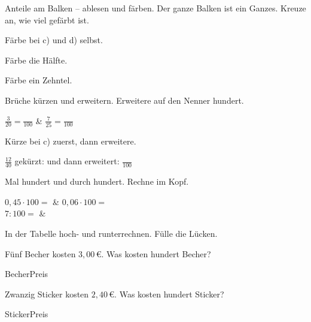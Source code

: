 \documentclass[11pt]{article}
\begin{document}
\weit


\begin{aufgabe}{Anteile am Balken -- ablesen und färben. Der ganze Balken ist ein Ganzes. Kreuze an, wie viel gefärbt ist.}
\begin{teile}
\teil
{}

  
\teil
{}

  
\end{teile}
Färbe bei c) und d) selbst.
\begin{teile}
\teil Färbe die Hälfte.

\teil Färbe ein Zehntel.

\end{teile}
\end{aufgabe}

\begin{aufgabe}{Brüche kürzen und erweitern. Erweitere auf den Nenner hundert.}
\begin{teilezwei}
\tz $\frac{3}{20} = \frac{\phantom{00}}{100}$ & \tz $\frac{7}{25} = \frac{\phantom{00}}{100}$ \\
\end{teilezwei}
Kürze bei c) zuerst, dann erweitere.
\begin{teile}
\teil $\frac{12}{40}$ gekürzt: \leerfeld{} \quad und dann erweitert: $\frac{\phantom{00}}{100}$
\end{teile}
\end{aufgabe}

\begin{aufgabe}{Mal hundert und durch hundert. Rechne im Kopf.}
\begin{teilezwei}
\tz $0{,}45 \cdot 100 = $ \leerfeld & \tz $0{,}06 \cdot 100 = $ \leerfeld \\
\tz $7 : 100 = $ \leerfeld & \\
\end{teilezwei}
\end{aufgabe}

\begin{aufgabe}{In der Tabelle hoch- und runterrechnen. Fülle die Lücken.}
\begin{teile}
\teil Fünf Becher kosten $3{,}00\,€$. Was kosten hundert Becher?

\begin{dreisatz}{Becher}{Preis}
\end{dreisatz}
\teil Zwanzig Sticker kosten $2{,}40\,€$. Was kosten hundert Sticker?

\begin{dreisatz}{Sticker}{Preis}
\end{dreisatz}
\end{teile}
\end{aufgabe}
\end{document}
